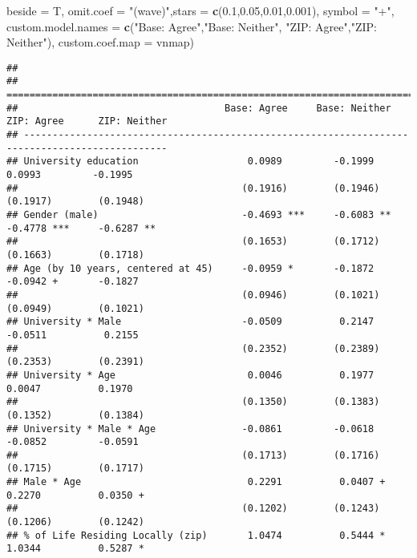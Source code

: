 \documentclass[
]{article}
\newenvironment{Shaded}{\begin{snugshade}}{\end{snugshade}}
\newcommand{\DataTypeTok}[1]{\textcolor[rgb]{0.13,0.29,0.53}{#1}}
\newcommand{\FloatTok}[1]{\textcolor[rgb]{0.00,0.00,0.81}{#1}}
\newcommand{\KeywordTok}[1]{\textcolor[rgb]{0.13,0.29,0.53}{\textbf{#1}}}
\newcommand{\NormalTok}[1]{#1}
\newcommand{\StringTok}[1]{\textcolor[rgb]{0.31,0.60,0.02}{#1}}
\begin{document}
\begin{Shaded}
\begin{Highlighting}[]
          \DataTypeTok{beside =}\NormalTok{ T,}
          \DataTypeTok{omit.coef =} \StringTok{"(wave)"}\NormalTok{,}\DataTypeTok{stars =} \KeywordTok{c}\NormalTok{(}\FloatTok{0.1}\NormalTok{,}\FloatTok{0.05}\NormalTok{,}\FloatTok{0.01}\NormalTok{,}\FloatTok{0.001}\NormalTok{), }\DataTypeTok{symbol =} \StringTok{"+"}\NormalTok{, }
          \DataTypeTok{custom.model.names =} \KeywordTok{c}\NormalTok{(}\StringTok{"Base: Agree"}\NormalTok{,}\StringTok{"Base: Neither"}\NormalTok{,}
                                 \StringTok{"ZIP: Agree"}\NormalTok{,}\StringTok{"ZIP: Neither"}\NormalTok{),}
          \DataTypeTok{custom.coef.map =}\NormalTok{ vnmap)}
\end{Highlighting}
\end{Shaded}

\begin{verbatim}
## 
## ===============================================================================================
##                                    Base: Agree     Base: Neither  ZIP: Agree      ZIP: Neither 
## -----------------------------------------------------------------------------------------------
## University education                   0.0989         -0.1999         0.0993         -0.1995   
##                                       (0.1916)        (0.1946)       (0.1917)        (0.1948)  
## Gender (male)                         -0.4693 ***     -0.6083 **     -0.4778 ***     -0.6287 **
##                                       (0.1653)        (0.1712)       (0.1663)        (0.1718)  
## Age (by 10 years, centered at 45)     -0.0959 *       -0.1872        -0.0942 +       -0.1827   
##                                       (0.0946)        (0.1021)       (0.0949)        (0.1021)  
## University * Male                     -0.0509          0.2147        -0.0511          0.2155   
##                                       (0.2352)        (0.2389)       (0.2353)        (0.2391)  
## University * Age                       0.0046          0.1977         0.0047          0.1970   
##                                       (0.1350)        (0.1383)       (0.1352)        (0.1384)  
## University * Male * Age               -0.0861         -0.0618        -0.0852         -0.0591   
##                                       (0.1713)        (0.1716)       (0.1715)        (0.1717)  
## Male * Age                             0.2291          0.0407 +       0.2270          0.0350 + 
##                                       (0.1202)        (0.1243)       (0.1206)        (0.1242)  
## % of Life Residing Locally (zip)       1.0474          0.5444 *       1.0344          0.5287 * 

\end{verbatim}
\end{document}
